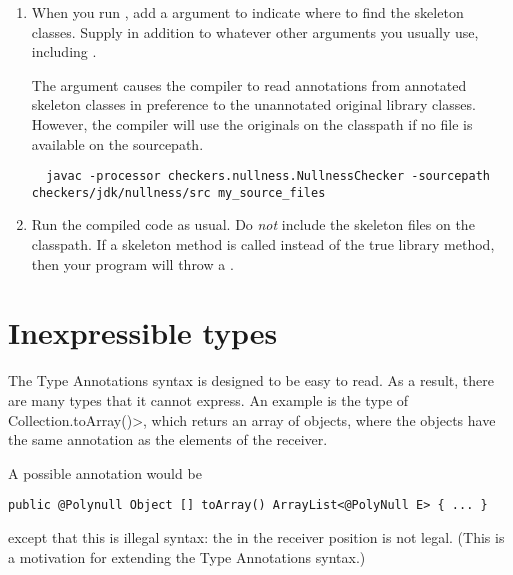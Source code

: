 \begin{enumerate}

\item
  When you run , add a  argument to indicate
  where to find the skeleton classes.
  Supply  in addition to whatever other arguments you
  usually use, including .

  The  argument causes the compiler to read annotations
  from annotated skeleton classes in preference to the unannotated original
  library classes.  However, the compiler will use the originals on the
  classpath if no file is available on the sourcepath.

\begin{smaller}
\begin{Verbatim}
  javac -processor checkers.nullness.NullnessChecker -sourcepath checkers/jdk/nullness/src my_source_files
\end{Verbatim}
\end{smaller}

\item
  Run the compiled code as usual.  Do \emph{not} include the skeleton files
  on the classpath.  If a skeleton method is called instead of the true
  library method, then your program will throw a .

\end{enumerate}


\section{Inexpressible types\label{inexpressible-types}}

The Type Annotations syntax is designed to be easy to read.  As a result,
there are many types that it cannot express.  An example is the type of 
\<Collection.toArray()>, which returs an array of objects, where the
objects have the same annotation as the elements of the receiver.

A possible annotation would be 

\begin{Verbatim}
public @Polynull Object [] toArray() ArrayList<@PolyNull E> { ... }
\end{Verbatim}

\noindent
except that this is illegal syntax:  the  in
the receiver position is not legal.
(This is a motivation for extending the Type Annotations syntax.)

